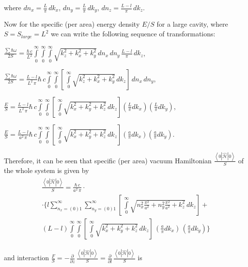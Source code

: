\documentclass[twoside, 10pt, ptm]{article}
\begin{document}
\begin{multicols}{2}
where \(dn_x = \frac{L}{\pi}\,dk_x\), \(dn_y = \frac{L}{\pi}\,dk_y\),
\(dn_z = \frac{L-l}{\pi}\,dk_z\).

    Now for the specific (per area) energy density \(E/S\) for a large cavity, where
\(S = S_{large} = L^2\) we can write the following sequence of transformations:

\noindent
\(\frac{\sum\hbar\omega}{2 S} = \frac{\hbar\,c}{L^2}\int\limits_{0}^{\infty}\int\limits_{0}^{\infty}\int\limits_{0}^{\infty}\sqrt{k_z^2+k_x^2+k_y^2}\,dn_x\,dn_y\,\frac{L-l}{\pi}\,dk_z\),

\noindent
\(\frac{\sum\hbar\omega}{2 S} = \frac{L-l}{L^2\,\pi}\hbar\,c\int\limits_{0}^{\infty}\int\limits_{0}^{\infty}\left[\,\int\limits_{0}^{\infty}\sqrt{k_z^2+k_x^2+k_y^2}\,dk_z\right]\,dn_x\,dn_y\),

\noindent
\(\frac{E}{S} = \frac{L-l}{L^2\,\pi}\hbar\,c\int\limits_{0}^{\infty}\int\limits_{0}^{\infty}\left[\,\int\limits_{0}^{\infty}\sqrt{k_x^2+k_y^2+k_z^2}\,dk_z\right] \left(\frac{L}{\pi}dk_x\right) \left(\frac{L}{\pi}dk_y\right)\),

\noindent
\(\frac{E}{S} = \frac{L-l}{a^2\,\pi}\hbar\,c\int\limits_{0}^{\infty}\int\limits_{0}^{\infty}\left[\,\int\limits_{0}^{\infty}\sqrt{k_x^2+k_y^2+k_z^2}\,dk_z\right] \left(\frac{a}{\pi}dk_x\right) \left(\frac{a}{\pi}dk_y\right)\).

    Therefore, it can be seen that specific (per area) vacuum Hamiltonian
\(\frac{\left<0|\hat{\mathcal{H}}|0\right>}{S}\) of the whole system is
given by
\noindent
\[\begin{array}{lr}
\begin{array}{l}
\frac{\left<0|\hat{\mathcal{H}}|0\right>}{S} = \frac{\hbar\,c}{a^2\,\pi} \cdot\\
\cdot \Bigg\{l\sum\limits_{n_x=(0)1}^{\infty}\sum\limits_{n_y=(0)1}^{\infty}\left[\,\int\limits_{0}^{\infty}\sqrt{n_x^2\frac{\pi^2}{a^2}+n_y^2\frac{\pi^2}{a^2}+k_z^2}\,dk_z\right] + \\
(L-l)\int\limits_{0}^{\infty}\int\limits_{0}^{\infty}\left[\,\int\limits_{0}^{\infty}\sqrt{k_x^2+k_y^2+k_z^2}\,dk_z\right]\,\left(\frac{a}{\pi}dk_x\right)\,\left(\frac{a}{\pi}dk_y\right)\Bigg\}
\end{array}\end{array}\]

and interaction
\(\frac{F}{S} = -\frac{\partial }{\partial z} \,\frac{\left<0|\hat{\mathcal{H}}|0\right>}{S} = \frac{\partial}{\partial l} \,\frac{\left<0|\hat{\mathcal{H}}|0\right>}{S}\)
is

\end{multicols}
\end{document}
